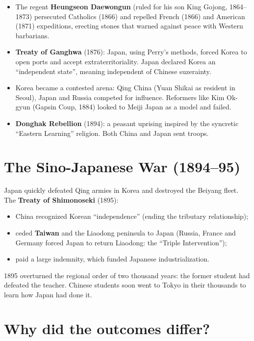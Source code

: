 \begin{itemize}
  \item The regent \textbf{Heungseon Daewongun} (ruled for his son King Gojong, 1864--1873)
        persecuted Catholics (1866) and repelled French (1866) and American (1871)
        expeditions, erecting stones that warned against peace with Western barbarians.
  \item \textbf{Treaty of Ganghwa} (1876): Japan, using Perry's methods, forced Korea to open
        ports and accept extraterritoriality. Japan declared Korea an ``independent state'',
        meaning independent of Chinese suzerainty.
  \item Korea became a contested arena: Qing China (Yuan Shikai as resident in Seoul),
        Japan and Russia competed for influence. Reformers like Kim Ok-gyun (Gapsin Coup,
        1884) looked to Meiji Japan as a model and failed.
  \item \textbf{Donghak Rebellion} (1894): a peasant uprising inspired by the syncretic
        ``Eastern Learning'' religion. Both China and Japan sent troops.
\end{itemize}

\section{The Sino-Japanese War (1894--95)}

Japan quickly defeated Qing armies in Korea and destroyed the Beiyang fleet. The
\textbf{Treaty of Shimonoseki} (1895):

\begin{itemize}
  \item China recognized Korean ``independence'' (ending the tributary relationship);
  \item ceded \textbf{Taiwan} and the Liaodong peninsula to Japan (Russia, France and
        Germany forced Japan to return Liaodong: the ``Triple Intervention'');
  \item paid a large indemnity, which funded Japanese industrialization.
\end{itemize}

\begin{remark}
1895 overturned the regional order of two thousand years: the former student had defeated
the teacher. Chinese students soon went to Tokyo in their thousands to learn how Japan had
done it.
\end{remark}

\section{Why did the outcomes differ?}


